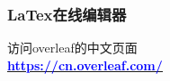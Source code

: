 \begin{frame}[t]
\frametitle{LaTex在线编辑器}
\vspace{1cm}
访问overleaf的中文页面 \\
\vspace{4cm}
\centering
\underline{\Huge \textbf{\href{https://cn.overleaf.com/}{\textcolor{blue}{https://cn.overleaf.com/}}}} \\

\end{frame}
